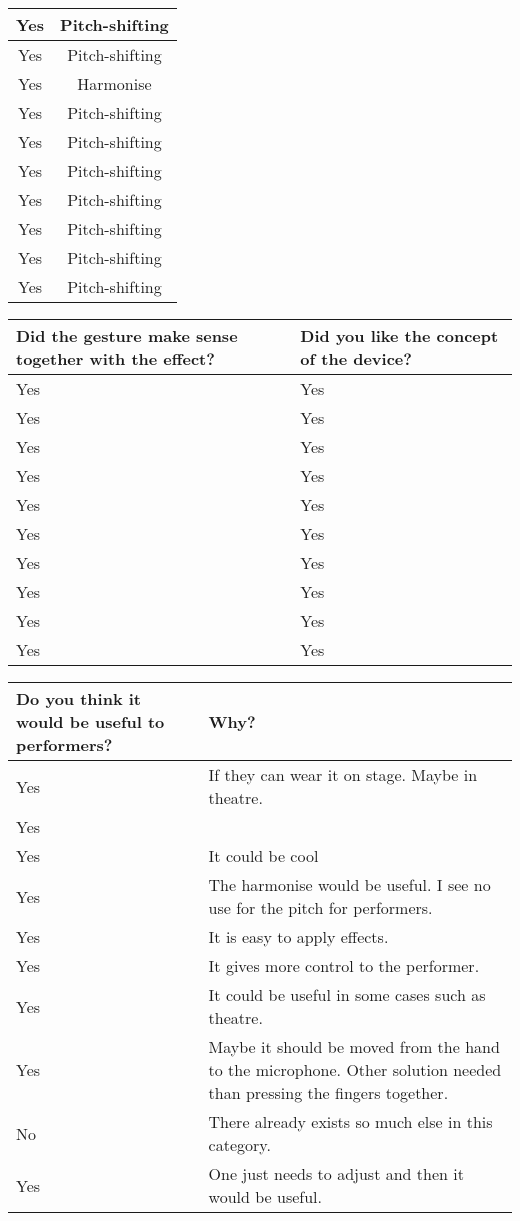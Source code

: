 \begin{center}
\begin{tabular}{| c |  c |}
Yes & Pitch-shifting \\ \hline
Yes & Pitch-shifting \\ \hline
Yes & Harmonise  \\ \hline
Yes & Pitch-shifting \\ \hline
Yes & Pitch-shifting \\ \hline
Yes & Pitch-shifting \\ \hline
Yes & Pitch-shifting \\ \hline
Yes & Pitch-shifting \\ \hline
Yes & Pitch-shifting \\ \hline
Yes & Pitch-shifting \\ \hline
\end{tabular}
\newline
\vspace*{1 cm}
\newline
\begin{tabular}{| p{5cm} | p{5cm} |}
\hline
Did the gesture make sense together with the effect? & Did you like the concept of the device?  \\ \hline
Yes & Yes  \\ \hline
Yes & Yes   \\ \hline
Yes & Yes \\ \hline
Yes & Yes  \\ \hline
Yes & Yes \\ \hline
Yes & Yes  \\ \hline
Yes & Yes  \\ \hline
Yes & Yes  \\ \hline
Yes & Yes \\ \hline
Yes & Yes \\ \hline
\end{tabular}
\newline
\vspace*{1 cm}
\newline
\begin{tabular}{| p{5cm} | p{5cm} |}
\hline
Do you think it would be useful to performers? & Why? \\ \hline
Yes & If they can wear it on stage. Maybe in theatre. \\ \hline
Yes &  \\ \hline
Yes & It could be cool \\ \hline
Yes & The harmonise would be useful. I see no use for the pitch for performers. \\ \hline
Yes & It is easy to apply effects.  \\ \hline
Yes & It gives more control to the performer. \\ \hline
Yes & It could be useful in some cases such as theatre. \\ \hline
Yes & Maybe it should be moved from the hand to the microphone. Other solution needed than pressing the fingers together. \\ \hline
No & There already exists so much else in this category.  \\ \hline
Yes & One just needs to adjust and then it would be useful. \\ \hline
\end{tabular}

\end{center}